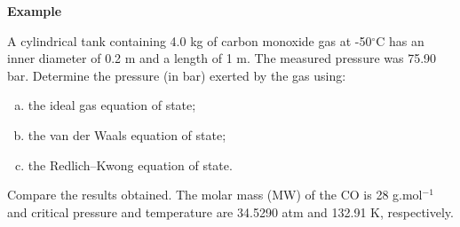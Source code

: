    \begin{MyExample}{\begin{center}{\bf Example}\end{center}}
     \begin{example}\label{Chapter:VolumetricPropertiesPureSubstances:Example2}\citep{Moran_Book}
       A cylindrical tank containing 4.0 kg of carbon monoxide gas at -50$^{\circ}$C has an inner diameter of 0.2 m and a length of 1 m. The measured pressure was 75.90 bar. Determine the pressure (in bar) exerted by the gas using:
       \begin{enumerate}[a)]
         \item the ideal gas equation of state;
         \item the van der Waals equation of state;
         \item the Redlich–Kwong equation of state.
       \end{enumerate}
       Compare the results obtained. The molar mass (MW) of the CO is 28 g.mol$^{-1}$ and critical pressure and temperature are 34.5290 atm and 132.91 K, respectively.
     \end{example}


\end{MyExample}

